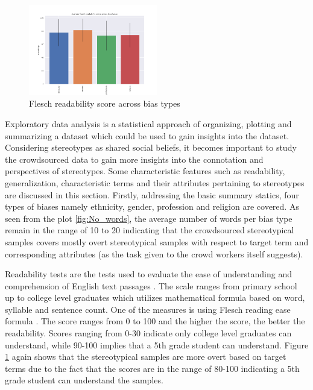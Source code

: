 \begin{figure}[h]
    \centering
    \includegraphics[width=0.5\textwidth]{thesis/figures/flesch_score.png}
    \caption{Flesch readability score across bias types}
    \label{fig:Flesch_scores}
\end{figure}
Exploratory data analysis is a statistical approach of organizing, plotting and summarizing a dataset which could be used to gain insights into the dataset. Considering stereotypes as shared social beliefs, it becomes important to study the crowdsourced data to gain more insights into the connotation and perspectives of stereotypes. Some characteristic features such as readability, generalization, characteristic terms and their attributes pertaining to stereotypes are discussed in this section.
Firstly, addressing the basic summary statics, four types of biases namely ethnicity, gender, profession and religion are covered. As seen from the plot \ref{fig:No_words}, the average number of words per bias type remain in the range of 10 to 20 indicating that the crowdsourced stereotypical samples covers mostly overt stereotypical samples with respect to target term and corresponding attributes (as the task given to the crowd workers itself suggests). 



Readability tests are the tests used to evaluate the ease of understanding and comprehension of English text passages \cite{barnett1979readability}. The scale ranges from primary school up to college level graduates which utilizes mathematical formula based on word, syllable and sentence count.  One of the measures is using Flesch reading ease formula \cite{flesch1948new}. The score ranges from 0 to 100 and the higher the score, the better the readability. Scores ranging from 0-30 indicate only college level graduates can understand, while 90-100 implies that a 5th grade student can understand. Figure \ref{fig:Flesch_scores} again shows that the stereotypical samples are more overt based on target terms due to the fact that the scores are in the range of 80-100 indicating a 5th grade student can understand the samples.

